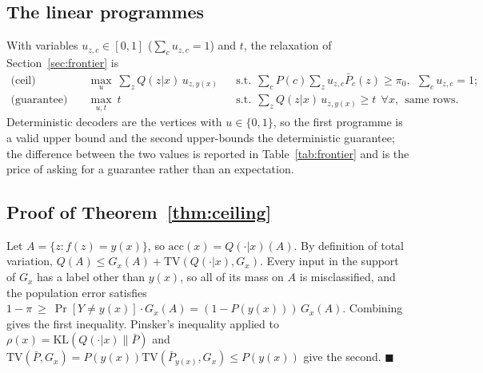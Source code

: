 \documentclass[11pt]{article}
\providecommand{\KL}{\mathrm{KL}}
\providecommand{\TV}{\mathrm{TV}}
\begin{document}
\subsection{The linear programmes}
With variables $u_{z,c}\in[0,1]$ ($\sum_c u_{z,c}=1$) and $t$, the relaxation of
Section~\ref{sec:frontier} is
\[
\begin{aligned}
\text{(ceil)}\quad&\max_{u}\ \sum_{z}Q(z|x)\,u_{z,y(x)}
&&\text{s.t.}\ \ \textstyle\sum_c P(c)\sum_z u_{z,c}\bar P_c(z)\ge\pi_0,\ \ \sum_c u_{z,c}=1;\\
\text{(guarantee)}\quad&\max_{u,t}\ t
&&\text{s.t.}\ \ \textstyle\sum_z Q(z|x)\,u_{z,y(x)}\ge t\ \ \forall x,\ \ \text{same rows.}
\end{aligned}
\]
Deterministic decoders are the vertices with $u\in\{0,1\}$, so the first programme is a valid
upper bound and the second upper-bounds the deterministic guarantee; the difference between the
two values is reported in Table~\ref{tab:frontier} and is the price of asking for a guarantee
rather than an expectation.

\subsection{Proof of Theorem~\ref{thm:ceiling}}
Let $A=\{z:f(z)=y(x)\}$, so $\mathrm{acc}(x)=Q(\cdot|x)(A)$. By definition of total variation,
$Q(A)\le G_x(A)+\TV(Q(\cdot|x),G_x)$. Every input in the support of $G_x$ has a label other
than $y(x)$, so all of its mass on $A$ is misclassified, and the population error satisfies
$1-\pi\ \ge\ \Pr[Y\ne y(x)]\cdot G_x(A)=(1-P(y(x)))\,G_x(A)$. Combining gives the first
inequality. Pinsker's inequality applied to $\rho(x)=\KL(Q(\cdot|x)\|\bar P)$ and
$\TV(\bar P,G_x)=P(y(x))\TV(\bar P_{y(x)},G_x)\le P(y(x))$ give the second. \hfill$\blacksquare$
\end{document}
